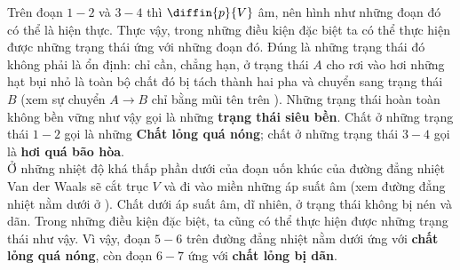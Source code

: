Trên đoạn $1-2$ và $3-4$ thì $\diffin{p}{V}$ âm, nên hình như những đoạn đó có thể là hiện thực. Thực vậy, trong những điều kiện đặc biệt ta có thể thực hiện được những trạng thái ứng với những đoạn đó. Đúng là những trạng thái đó không phải là ổn định: chỉ cần, chẳng hạn, ở trạng thái $A$ cho rơi vào hơi những hạt bụi nhỏ là toàn bộ chất đó bị tách thành hai pha và chuyển sang trạng thái $B$ (xem sự chuyển $A \to B$ chỉ bằng mũi tên trên ). Những trạng thái hoàn toàn không bền vững như vậy gọi là những \textbf{trạng thái siêu bền}. Chất ở những trạng thái $1-2$ gọi là những \textbf{Chất lỏng quá nóng}; chất ở những trạng thái $3-4$ gọi là \textbf{hơi quá bão hòa}.\\

Ở những nhiệt độ khá thấp phần dưới của đoạn uốn khúc của đường đẳng nhiệt Van der Waals sẽ cắt trục $V$ và đi vào miền những áp suất âm (xem đường đẳng nhiệt nằm dưới ở ). Chất dưới áp suất âm, dĩ nhiên, ở trạng thái không bị nén và dãn. Trong những điều kiện đặc biệt, ta cũng có thể thực hiện được những trạng thái như vậy. Vì vậy, đoạn $5-6$ trên đường đẳng nhiệt nằm dưới ứng với \textbf{chất lỏng quá nóng}, còn đoạn $6-7$ ứng với \textbf{chất lỏng bị dãn}.\\

